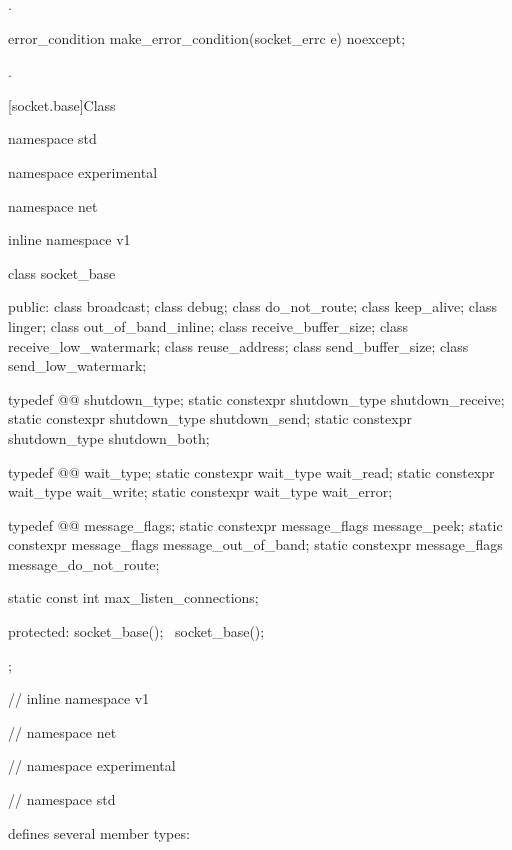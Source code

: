 \begin{itemdescr}
\pnum
\returns {}.
\end{itemdescr}

%
%
\begin{itemdecl}
error_condition make_error_condition(socket_errc e) noexcept;
\end{itemdecl}

\begin{itemdescr}
\pnum
\returns {}.
\end{itemdescr}



%
[socket.base]{Class }

\begin{codeblock}
namespace std {
namespace experimental {
namespace net {
inline namespace v1 {

  class socket_base
  {
  public:
    class broadcast;
    class debug;
    class do_not_route;
    class keep_alive;
    class linger;
    class out_of_band_inline;
    class receive_buffer_size;
    class receive_low_watermark;
    class reuse_address;
    class send_buffer_size;
    class send_low_watermark;

    typedef @@ shutdown_type;
    static constexpr shutdown_type shutdown_receive;
    static constexpr shutdown_type shutdown_send;
    static constexpr shutdown_type shutdown_both;

    typedef @@ wait_type;
    static constexpr wait_type wait_read;
    static constexpr wait_type wait_write;
    static constexpr wait_type wait_error;

    typedef @@ message_flags;
    static constexpr message_flags message_peek;
    static constexpr message_flags message_out_of_band;
    static constexpr message_flags message_do_not_route;

    static const int max_listen_connections;

  protected:
    socket_base();
    ~socket_base();
  };

} // inline namespace v1
} // namespace net
} // namespace experimental
} // namespace std
\end{codeblock}

\pnum
{} defines several member types:

